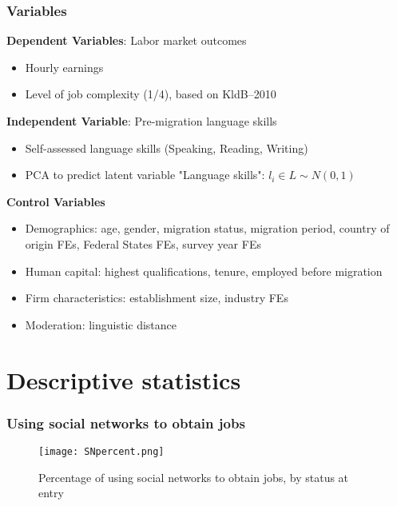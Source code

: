 \documentclass{beamer}
\begin{document}
\begin{frame}
\frametitle{Variables}

\textbf{Dependent Variables}: Labor market outcomes
\begin{itemize}
\item Hourly earnings
\item Level of job complexity (1/4), based on KldB--2010
\end{itemize}

\textbf{Independent Variable}: Pre-migration language skills
\begin{itemize}
\item Self-assessed language skills (Speaking, Reading, Writing)
\item PCA to predict latent variable "Language skills": $l_{i} \in L \sim N(0,1)$
\end{itemize}

\textbf{Control Variables}
\begin{itemize}
\item Demographics: age, gender, migration status, migration period, country of origin FEs, Federal States FEs, survey year FEs
\item Human capital: highest qualifications, tenure, employed before migration
\item Firm characteristics: establishment size, industry FEs
\item Moderation: linguistic distance
\end{itemize}

\end{frame}

\section{Descriptive statistics}

\begin{frame}
\frametitle{Using social networks to obtain jobs}

\begin{figure}
\centering
\texttt{[image: SNpercent.png]}
  \caption{Percentage of using social networks to obtain jobs, by status at entry}
\end{figure}

\end{frame}

\end{document}
